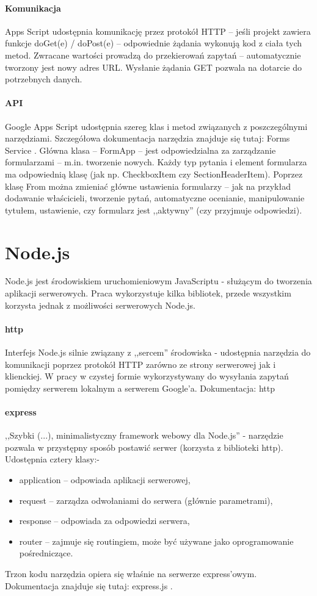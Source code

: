 \paragraph{Komunikacja}
 Apps Script udostępnia komunikację przez protokół HTTP -- jeśli projekt zawiera funkcje doGet(e) / doPost(e) -- odpowiednie żądania wykonują kod z ciała tych metod. Zwracane wartości prowadzą do przekierowań zapytań  -- automatycznie tworzony jest nowy adres URL. Wysłanie żądania GET pozwala na dotarcie do potrzebnych danych. 
\paragraph{API}
Google Apps Script udostępnia szereg klas i metod związanych z poszczególnymi narzędziami. Szczegółowa dokumentacja narzędzia znajduje się tutaj: Forms Service \cite{FormsService}.
 Główna klasa -- FormApp -- jest odpowiedzialna za zarządzanie formularzami -- m.in. tworzenie nowych. Każdy typ pytania i element formularza ma odpowiednią klasę (jak np. CheckboxItem czy SectionHeaderItem). Poprzez klasę From  można zmieniać główne ustawienia formularzy  -- jak na przykład dodawanie właścicieli, tworzenie pytań, automatyczne ocenianie, manipulowanie tytułem, ustawienie, czy formularz jest ,,aktywny'' (czy przyjmuje odpowiedzi).
 
 
\section{Node.js}
Node.js jest środowiskiem uruchomieniowym JavaScriptu - służącym do tworzenia aplikacji serwerowych. 
Praca wykorzystuje kilka bibliotek, przede wszystkim korzysta jednak z możliwości serwerowych Node.js. 
\paragraph{http}
Interfejs Node.js silnie związany z ,,sercem'' środowiska - udostępnia narzędzia do komunikacji poprzez protokół  HTTP zarówno ze strony serwerowej jak i klienckiej. W pracy w czystej formie wykorzystywany do wysyłania zapytań pomiędzy serwerem lokalnym a serwerem Google'a.
\newline Dokumentacja: http  \cite{https}
\paragraph{express}
,,Szybki (...), minimalistyczny framework webowy dla Node.js'' - narzędzie pozwala w przystępny sposób postawić serwer (korzysta z biblioteki http). Udostępnia cztery klasy:-
\begin{itemize}
\item application -- odpowiada aplikacji serwerowej,
\item  request -- zarządza odwołaniami do serwera (głównie parametrami),
\item response -- odpowiada za odpowiedzi serwera,
\item router -- zajmuje się routingiem, może być używane jako oprogramowanie pośredniczące.
\end{itemize}
Trzon kodu narzędzia opiera się właśnie na serwerze express'owym.
\ind Dokumentacja znajduje się tutaj: express.js \cite{express}.
